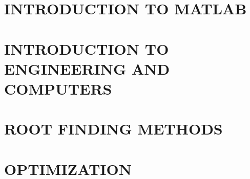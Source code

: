 \documentclass{book}
\begin{document}


\tableofcontents

%

%

%

%


\section{INTRODUCTION TO MATLAB}

















%

\section{INTRODUCTION TO ENGINEERING AND COMPUTERS}







\section{ROOT FINDING METHODS}







%

%

\section{OPTIMIZATION}




\end{document}
